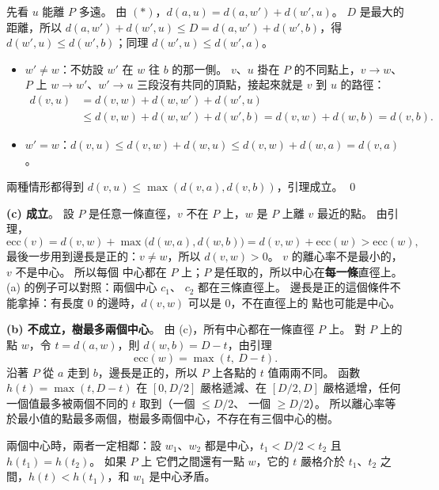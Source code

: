 \begin{pastsoln}
先看 $u$ 能離 $P$ 多遠。 由 $(*)$，$d(a, u) = d(a, w') + d(w', u)$。 $D$ 是最大的距離，所以
$d(a, w') + d(w', u) \le D = d(a, w') + d(w', b)$，得 $d(w', u) \le d(w', b)$；同理
$d(w', u) \le d(w', a)$。

\begin{itemize}
\item $w' \ne w$：不妨設 $w'$ 在 $w$ 往 $b$ 的那一側。 $v$、$u$ 掛在 $P$ 的不同點上，$v \to w$、$P$ 上
$w \to w'$、$w' \to u$ 三段沒有共同的頂點，接起來就是 $v$ 到 $u$ 的路徑：
\begin{align*}
d(v, u) &= d(v, w) + d(w, w') + d(w', u) \\
&\le d(v, w) + d(w, w') + d(w', b) = d(v, w) + d(w, b) = d(v, b).
\end{align*}
\item $w' = w$：$d(v, u) \le d(v, w) + d(w, u) \le d(v, w) + d(w, a) = d(v, a)$。
\end{itemize}
兩種情形都得到 $d(v, u) \le \max(d(v, a), d(v, b))$，引理成立。 \qed

\textbf{(c) 成立}。 設 $P$ 是任意一條直徑，$v$ 不在 $P$ 上，$w$ 是 $P$ 上離 $v$ 最近的點。 由引理，
\[
\mathrm{ecc}(v) = d(v, w) + \max\bigl(d(w, a), d(w, b)\bigr) = d(v, w) + \mathrm{ecc}(w) > \mathrm{ecc}(w),
\]
最後一步用到邊長是正的：$v \ne w$，所以 $d(v, w) > 0$。 $v$ 的離心率不是最小的，$v$ 不是中心。 所以每個
中心都在 $P$ 上；$P$ 是任取的，所以中心在\textbf{每一條}直徑上。 (a) 的例子可以對照：兩個中心 $c_1$、
$c_2$ 都在三條直徑上。 邊長是正的這個條件不能拿掉：有長度 $0$ 的邊時，$d(v, w)$ 可以是 $0$，不在直徑上的
點也可能是中心。

\textbf{(b) 不成立，樹最多兩個中心}。 由 (c)，所有中心都在一條直徑 $P$ 上。 對 $P$ 上的點 $w$，令
$t = d(a, w)$，則 $d(w, b) = D - t$，由引理
\[
\mathrm{ecc}(w) = \max(t,\ D - t).
\]
沿著 $P$ 從 $a$ 走到 $b$，邊長是正的，所以 $P$ 上各點的 $t$ 值兩兩不同。 函數 $h(t) = \max(t, D - t)$
在 $[0, D/2]$ 嚴格遞減、在 $[D/2, D]$ 嚴格遞增，任何一個值最多被兩個不同的 $t$ 取到（一個 $\le D/2$、
一個 $\ge D/2$）。 所以離心率等於最小值的點最多兩個，樹最多兩個中心，不存在有三個中心的樹。

兩個中心時，兩者一定相鄰：設 $w_1$、$w_2$ 都是中心，$t_1 < D/2 < t_2$ 且 $h(t_1) = h(t_2)$。 如果 $P$ 上
它們之間還有一點 $w$，它的 $t$ 嚴格介於 $t_1$、$t_2$ 之間，$h(t) < h(t_1)$，和 $w_1$ 是中心矛盾。
\end{pastsoln}
